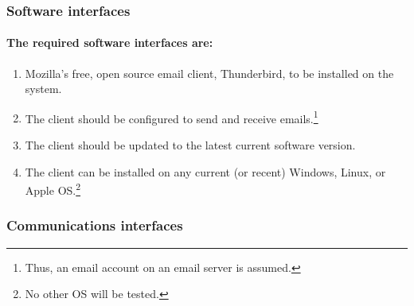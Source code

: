\subsubsection{Software interfaces}
%
%

\paragraph{The required software interfaces are:}
\begin{enumerate}
\item Mozilla's free, open source email client, Thunderbird, to be installed on the system.
\item The client should be configured to send and receive emails.\footnote{Thus, an email account on an email server is assumed.}
\item The client should be updated to the latest current software version.
\item The client can be installed on any current (or recent) Windows, Linux, or Apple OS.\footnote{No other OS will be tested.}
\end{enumerate}



\subsubsection{Communications interfaces}
